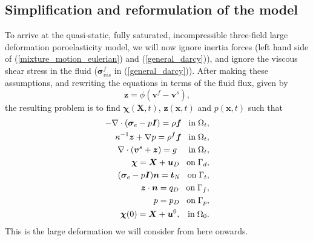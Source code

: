 \subsection{Simplification and reformulation of the model}
To arrive at the quasi-static, fully saturated, incompressible three-field large deformation poroelasticity model, we will now ignore inertia forces (left hand side of (\ref{mixture_motion_eulerian}) and (\ref{general_darcy})), and ignore the viscous shear stress in the fluid ($\boldsymbol{\sigma}_{vis}^{f}$ in  (\ref{general_darcy})). After making these assumptions, and rewriting the equations in terms of the fluid flux, given by
\begin{equation}
  \boldsymbol{z}=\phi(\boldsymbol{v}^{f}-\boldsymbol{v}^{s}),
\label{eqn:relative_fluid}
\end{equation}
the resulting problem is to find $\boldsymbol{\chi}(\boldsymbol{X},t)$,  $\boldsymbol{z}(\boldsymbol{x},t)$ and $p(\boldsymbol{x},t)$ such that
\begin{subequations}
\begin{align}
\label{eqn:mixture_momentum_reform}
-\nabla \cdot( \boldsymbol{\sigma}_{e} -p\boldsymbol{I}) = \rho\boldsymbol{f} \;\;\; \mbox{in} \; \Omega_{t},\\
\label{eqn:fluid_momentum_reform}
{\mathbf{\kappa}^{-1}\boldsymbol{z}} + \nabla p =  \rho^{f}\boldsymbol{f} \;\;\; \mbox{in} \; \Omega_{t}, \\
\label{eqn:mixture_mass_reform}
\nabla \cdot (\boldsymbol{v}^{s} + \boldsymbol{z} )  = g \;\;\;\;\;\mbox{in}\;\Omega_{t},
\\
\boldsymbol{\chi} =\boldsymbol{X}+\boldsymbol{u}_{D}   \;\;\; \mbox{on}\; \Gamma_{d},
\\
(\boldsymbol{\sigma}_{e}-p\boldsymbol{I})\boldsymbol{n} = \boldsymbol{t}_{N}   \;\;\; \mbox{on}\; \Gamma_{t},
\\
\boldsymbol{z} \cdot \boldsymbol{n} = {q_{D}}   \;\;\; \mbox{on}\; \Gamma_{f},
\\
p = p_{D}   \;\;\; \mbox{on}\; \Gamma_{p},
\\
\boldsymbol{\chi}(0) = \boldsymbol{X} + \boldsymbol{u}^{0},   \;\;\;  \mbox{in}\;\Omega_{0}.
\end{align}
\label{eqn:simple_mixture_model}
\end{subequations}
This is the large deformation we will consider from here onwards.


